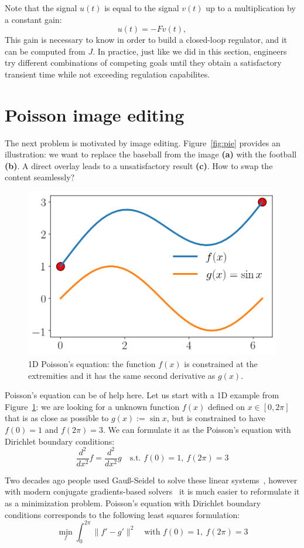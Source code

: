 \documentclass[notitlepage,oneside]{book}
\begin{document}

Note that the signal $u(t)$ is equal to the signal $v(t)$ up to a multiplication by a constant gain:
$$
u(t) = -F v(t),
$$
This gain is necessary to know in order to build a closed-loop regulator, and it can be computed from $J$.
In practice, just like we did in this section,
engineers try different combinations of competing goals until they obtain a satisfactory transient time while not exceeding regulation capabilites.






\section{Poisson image editing}
\label{sec:poisson}
The next problem is motivated by image editing.
Figure~\ref{fig:pie} provides an illustration:
we want to replace the baseball from the image \textbf{(a)} with the football \textbf{(b)}. A direct overlay leads to a unsatisfactory result \textbf{(c)}.
How to swap the content seamlessly?

\begin{figure}[tb]
    \centering
    \includegraphics[width=.34\linewidth]{pie-1d.png}
    \caption{1D Poisson's equation: the function $f(x)$ is constrained at the extremities and it has the same second derivative as $g(x)$.}
    \label{fig:pie1d}
\end{figure}

Poisson's equation can be of help here. Let us start with a 1D example from Figure~\ref{fig:pie1d}: we are looking for a unknown function $f(x)$ defined on $x\in[0,2\pi]$ that is as close as possible to $g(x):=\sin x$, but is constrained to have $f(0)=1$ and $f(2\pi) = 3$.
We can formulate it as the Poisson's equation with Dirichlet boundary conditions:
$$
\frac{d^2}{dx^2}f  = \frac{d^2}{dx^2} g \quad \text{s.t.~} f(0)=1,~f(2\pi) = 3
$$

Two decades ago people used Gauß-Seidel to solve these linear systems~\cite{10.1145/882262.882269},
however with modern conjugate gradients-based solvers~\cite{OpenNL} it is much easier to reformulate it as a minimization problem.
Poisson's equation with Dirichlet boundary conditions corresponds to the following least squares formulation:
$$
\min\limits_{f} \int_0^{2\pi} \|f' - g'\|^2 \quad \text{with~} f(0)=1,~f(2\pi) = 3
$$
\end{document}
